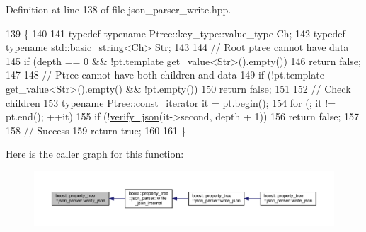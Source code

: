 Definition at line 138 of file json\+\_\+parser\+\_\+write.\+hpp.


\begin{DoxyCode}
139 \{
140 
141   \textcolor{keyword}{typedef} \textcolor{keyword}{typename} Ptree::key\_type::value\_type Ch;
142   \textcolor{keyword}{typedef} \textcolor{keyword}{typename} std::basic\_string<Ch> Str;
143 
144   \textcolor{comment}{// Root ptree cannot have data}
145   \textcolor{keywordflow}{if} (depth == 0 && !pt.template get\_value<Str>().empty())
146     \textcolor{keywordflow}{return} \textcolor{keyword}{false};
147 
148   \textcolor{comment}{// Ptree cannot have both children and data}
149   \textcolor{keywordflow}{if} (!pt.template get\_value<Str>().empty() && !pt.empty())
150     \textcolor{keywordflow}{return} \textcolor{keyword}{false};
151 
152   \textcolor{comment}{// Check children}
153   \textcolor{keyword}{typename} Ptree::const\_iterator it = pt.begin();
154   \textcolor{keywordflow}{for} (; it != pt.end(); ++it)
155     \textcolor{keywordflow}{if} (!\hyperlink{namespaceboost_1_1property__tree_1_1json__parser_ad1f43753e8e91845fdb1177c1aa0c465}{verify\_json}(it->second, depth + 1))
156       \textcolor{keywordflow}{return} \textcolor{keyword}{false};
157 
158   \textcolor{comment}{// Success}
159   \textcolor{keywordflow}{return} \textcolor{keyword}{true};
160 
161 \}
\end{DoxyCode}


Here is the caller graph for this function\+:
\nopagebreak
\begin{figure}[H]
\begin{center}
\leavevmode
\includegraphics[width=350pt]{namespaceboost_1_1property__tree_1_1json__parser_ad1f43753e8e91845fdb1177c1aa0c465_icgraph}
\end{center}
\end{figure}


